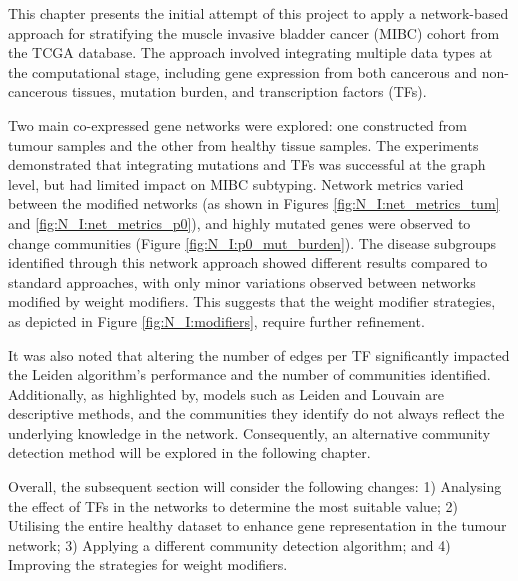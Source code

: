 This chapter presents the initial attempt of this project to apply a network-based approach for stratifying the muscle invasive bladder cancer (MIBC) cohort from the TCGA database. The approach involved integrating multiple data types at the computational stage, including gene expression from both cancerous and non-cancerous tissues, mutation burden, and transcription factors (TFs).

Two main co-expressed gene networks were explored: one constructed from tumour samples and the other from healthy tissue samples. The experiments demonstrated that integrating mutations and TFs was successful at the graph level, but had limited impact on MIBC subtyping. Network metrics varied between the modified networks (as shown in Figures \ref{fig:N_I:net_metrics_tum} and \ref{fig:N_I:net_metrics_p0}), and highly mutated genes were observed to change communities (Figure \ref{fig:N_I:p0_mut_burden}). The disease subgroups identified through this network approach showed different results compared to standard approaches, with only minor variations observed between networks modified by weight modifiers. This suggests that the weight modifier strategies, as depicted in Figure \ref{fig:N_I:modifiers}, require further refinement.

It was also noted that altering the number of edges per TF significantly impacted the Leiden algorithm's performance and the number of communities identified. Additionally, as highlighted by\citet{Peixoto2021-jx, Peixoto2023-rt}, models such as Leiden and Louvain are descriptive methods, and the communities they identify do not always reflect the underlying knowledge in the network. Consequently, an alternative community detection method will be explored in the following chapter.

Overall, the subsequent section will consider the following changes: 1) Analysing the effect of TFs in the networks to determine the most suitable value; 2) Utilising the entire healthy dataset to enhance gene representation in the tumour network; 3) Applying a different community detection algorithm; and 4) Improving the strategies for weight modifiers.

